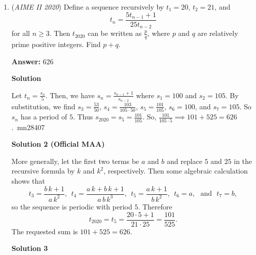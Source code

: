 \begin{enumerate}
 



\textbf{Solution 2 (Official MAA)}

First note that if $h_b(s)$ is the least positive integer whose digit sum, in some fixed base $b$, is $s$, then $h_b$ is a strictly increasing function. This together with the fact that $g(N) \ge 10$ shows that $f(N)$ is the least positive integer whose base-eight digit sum is 10. Thus $f(N) = 37_\text{eight} = 31$, and $N$ is the least positive integer whose base-four digit sum is $31.$ Therefore 
 \[N = 13333333333_\text{four} = 2\cdot4^{10} - 1 = 2\cdot1024^2 - 1\]
 \[\equiv 2\cdot24^2 - 1 \equiv 151 \pmod{1000}.\]



	\item (\textit{AIME II 2020}) Define a sequence recursively by $t_1 = 20$, $t_2 = 21$, and
 \[t_n = \frac{5t_{n-1}+1}{25t_{n-2}}\]for all $n \ge 3$. Then $t_{2020}$ can be written as $\frac{p}{q}$, where $p$ and $q$ are relatively prime positive integers. Find $p+q$.


 
 \textbf{Answer: }626



\textbf{Solution}

Let $t_n=\frac{s_n}{5}$. Then, we have $s_n=\frac{s_{n-1}+1}{s_{n-2}}$ where $s_1 = 100$ and $s_2 = 105$. By substitution, we find $s_3 = \frac{53}{50}$, $s_4=\frac{103}{105\cdot50}$, $s_5=\frac{101}{105}$, $s_6=100$, and $s_7=105$. So $s_n$ has a period of $5$. Thus $s_{2020}=s_5=\frac{101}{105}$. So, $\frac{101}{105\cdot 5}\implies 101+525=\boxed{626}$.~mn28407

 



\textbf{Solution 2 (Official MAA)}

More generally, let the first two terms be $a$ and $b$ and replace $5$ and $25$ in the recursive formula by $k$ and $k^2$, respectively. Then some algebraic calculation shows that
 \[t_3 = \frac{b\,k+1}{a\, k^2},~~t_4 = \frac{a\, k + b\,k+1}{a\,b\, k^3},~~ t_5 = \frac{a\,k+1}{b\, k^2},~~ t_6 = a, \text{~ and ~}t_7 =b,\]so the sequence is periodic with period $5$. Therefore
 \[t_{2020} = t_{5} =  \frac{20\cdot 5 +1}{21\cdot  25} = \frac{101}{525}.\]The requested sum is $101+525=626$.

 



\textbf{Solution 3}


\end{enumerate}
